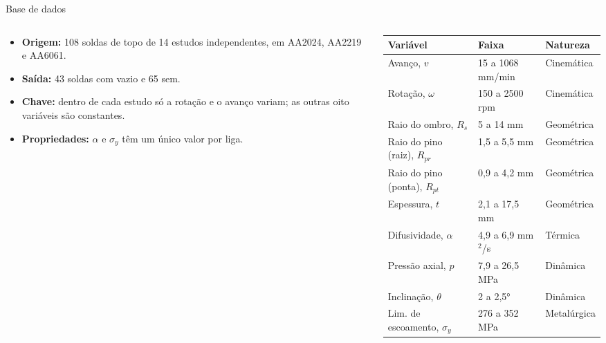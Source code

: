 \documentclass[aspectratio=169,11pt]{beamer}
\newenvironment{bullets}{\begin{itemize}\setlength{\itemsep}{5pt}}{\end{itemize}}
\begin{document}
\begin{frame}{Base de dados}
\begin{columns}[T,onlytextwidth]
\begin{column}{0.39\textwidth}
\begin{bullets}
  \item \textbf{Origem:} 108 soldas de topo de 14 estudos independentes, em AA2024, AA2219 e AA6061.
  \item \textbf{Saída:} 43 soldas com vazio e 65 sem.
  \item \textbf{Chave:} dentro de cada estudo só a rotação e o avanço variam; as outras oito variáveis são constantes.
  \item \textbf{Propriedades:} $\alpha$ e $\sigma_y$ têm um único valor por liga.
\end{bullets}
\end{column}
\begin{column}{0.59\textwidth}
\centering\scriptsize\setlength{\tabcolsep}{3pt}
\begin{tabular}{lll}
\toprule
\textbf{Variável} & \textbf{Faixa} & \textbf{Natureza} \\ \midrule
Avanço, $v$ & 15 a 1068 mm/min & Cinemática \\
Rotação, $\omega$ & 150 a 2500 rpm & Cinemática \\
Raio do ombro, $R_s$ & 5 a 14 mm & Geométrica \\
Raio do pino (raiz), $R_{pr}$ & 1,5 a 5,5 mm & Geométrica \\
Raio do pino (ponta), $R_{pt}$ & 0,9 a 4,2 mm & Geométrica \\
Espessura, $t$ & 2,1 a 17,5 mm & Geométrica \\
Difusividade, $\alpha$ & 4,9 a 6,9 mm$^2$/s & Térmica \\
Pressão axial, $p$ & 7,9 a 26,5 MPa & Dinâmica \\
Inclinação, $\theta$ & 2 a 2,5° & Dinâmica \\
Lim. de escoamento, $\sigma_y$ & 276 a 352 MPa & Metalúrgica \\ \bottomrule
\end{tabular}
\end{column}
\end{columns}
\end{frame}
\end{document}
